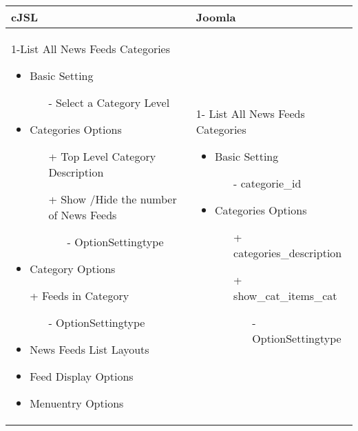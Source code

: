 \begin{minipage}{0.7\textwidth}
\begin{tabular}{|p{} | p{}|}
\hline
\textbf{cJSL} & \textbf{Joomla} \\ 
\hline
 1-List All News Feeds Categories
   \begin{itemize}
     \item Basic  Setting 
    		\begin{enumerate}
    			\item[-] Select a Category Level
    		\end{enumerate}
    	\item Categories Options
 	   	\begin{enumerate}
 	    \item[+] Top Level Category Description
 	    \item[+] Show /Hide the number of News Feeds 
 	    	  \begin{enumerate}
 	    			 \item[-] OptionSettingtype
 	    	\end{enumerate}
 	   \end{enumerate}
    	\item Category Options
    	\item[+] Feeds in Category 
    		    	  \begin{enumerate}
    		    			 \item[-] OptionSettingtype
    		    	\end{enumerate}
    \item News Feeds List Layouts
    \item Feed Display Options
 	\item Menuentry Options
  \end{itemize}
 & 
1- List All News Feeds Categories
  \begin{itemize}
    \item Basic  Setting 
   		\begin{enumerate}
   			\item[-] categorie\_id
   		\end{enumerate}
   	\item Categories Options
	   	\begin{enumerate}
	    \item[+]categories\_description
	    \item[+]show\_cat\_items\_cat 
	    	  \begin{enumerate}
	    			 \item[-] OptionSettingtype

\end{enumerate}
\end{enumerate}
\end{itemize}
\end{tabular}
\end{minipage}

